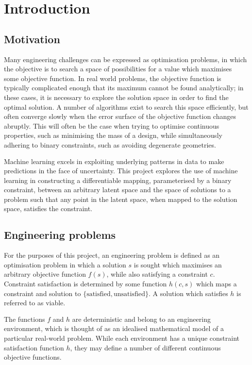 \documentclass[../../main.tex]{subfiles}
\begin{document}
\chapter{Introduction} \label{chapter:introduction}

\section{Motivation} \label{section:motivation}

Many engineering challenges can be expressed as optimisation problems, in which the objective is to search a space of possibilities for a value which maximises some objective function.
In real world problems, the objective function is typically complicated enough that its maximum cannot be found analytically; in these cases, it is necessary to explore the solution space in order to find the optimal solution.
A number of algorithms exist to search this space efficiently, but often converge slowly when the error surface of the objective function changes abruptly.
This will often be the case when trying to optimise continuous properties, such as minimising the mass of a design, while simultaneously adhering to binary constraints, such as avoiding degenerate geometries.

Machine learning excels in exploiting underlying patterns in data to make predictions in the face of uncertainty.
This project explores the use of machine learning in constructing a differentiable mapping, parameterised by a binary constraint, between an arbitrary latent space and the space of solutions to a problem such that any point in the latent space, when mapped to the solution space, satisfies the constraint.

\section{Engineering problems} \label{section:engineeringProblems}

For the purposes of this project, an engineering problem is defined as an optimisation problem in which a solution $s$ is sought which maximises an arbitrary objective function $f(s)$, while also satisfying a constraint $c$.
Constraint satisfaction is determined by some function $h(c,s)$ which maps a constraint and solution to $\{\text{satisfied},\text{unsatisfied}\}$.
A solution which satisfies $h$ is referred to as viable.

The functions $f$ and $h$ are deterministic and belong to an engineering environment, which is thought of as an idealised mathematical model of a particular real-world problem.
While each environment has a unique constraint satisfaction function $h$, they may define a number of different continuous objective functions.
\end{document}

